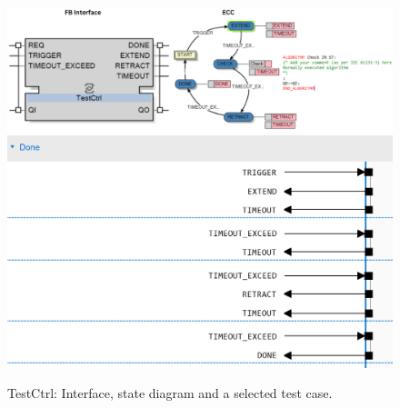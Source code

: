 \begin{bibunit}
\begin{figure}[!htbp]
	\centering
		\includegraphics[width=0.99\linewidth,clip]{MX_Papers/Paper10/Figures/TestCtrl.png}
            \includegraphics[width=0.99\linewidth]{MX_Papers/Paper10/Figures/tests_casestudy/Service-TestCtrl_timeout.png}
		\caption{TestCtrl: Interface, state diagram and a selected test case.}
		\label{fig:TestCtrl}	
 \end{figure}
 

\end{bibunit}
